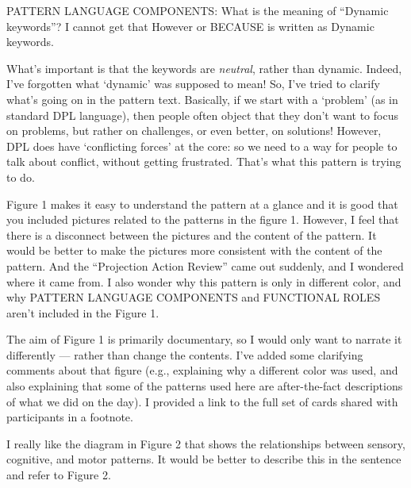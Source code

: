 \documentclass[acmlarge,timestamp]{acmart}
\begin{document}
\begin{leftbubbles}
PATTERN LANGUAGE COMPONENTS: What is the meaning of “Dynamic
keywords”? I cannot get that However or BECAUSE is written as Dynamic
keywords.
\end{leftbubbles}

\begin{rightbubbles}
What’s important is that the keywords are \emph{neutral}, rather than
dynamic.  Indeed, I’ve forgotten what ‘dynamic’ was supposed to mean!
So, I’ve tried to clarify what’s going on in the pattern text.
Basically, if we start with a ‘problem’ (as in standard DPL language),
then people often object that they don’t want to focus on problems,
but rather on challenges, or even better, on solutions!  However, DPL
does have ‘conflicting forces’ at the core: so we need to a way for
people to talk about conflict, without getting frustrated.  That’s
what this pattern is trying to do. {\large {}}
\end{rightbubbles}

\begin{leftbubbles}
Figure 1 makes it easy to understand the pattern at a glance and it is
good that you included pictures related to the patterns in the figure
1. However, I feel that there is a disconnect between the pictures and
the content of the pattern. It would be better to make the pictures
more consistent with the content of the pattern. And the “Projection
Action Review” came out suddenly, and I wondered where it came from. I
also wonder why this pattern is only in different color, and why
PATTERN LANGUAGE COMPONENTS and FUNCTIONAL ROLES aren’t included in
the Figure 1.
\end{leftbubbles}

\begin{rightbubbles}
The aim of Figure 1 is primarily documentary, so I would only want to
narrate it differently — rather than change the contents.  I’ve added
some clarifying comments about that figure (e.g., explaining why a
different color was used, and also explaining that some of the
patterns used here are after-the-fact descriptions of what we did on
the day).  I provided a link to the full set of cards shared with
participants in a footnote. {\large {}}
\end{rightbubbles}

\begin{leftbubbles}
I really like the diagram in Figure 2 that shows the relationships
between sensory, cognitive, and motor patterns. It would be better to
describe this in the sentence and refer to Figure 2.
\end{leftbubbles}
\end{document}
